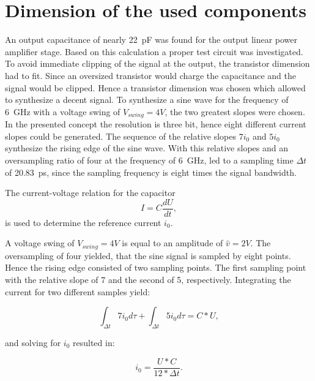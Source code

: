 \section{Dimension of the used components}
An output capacitance of nearly \SI{22}{\pico \farad} was found for the output linear power amplifier stage.
Based on this calculation a proper test circuit was investigated.
To avoid immediate clipping of the signal at the output, the transistor dimension had to fit.
Since an oversized transistor would charge the capacitance and the signal would be clipped.
Hence a transistor dimension was chosen which allowed to synthesize a decent signal.
To synthesize a sine wave for the frequency of \SI{6}{\giga \hertz} with a voltage swing of $V_{swing} = 4V$, the two greatest slopes were chosen.
In the presented concept the resolution is three bit, hence eight different current slopes could be generated.
The sequence of the relative slopes $7 i_0$ and $5 i_0$ synthesize the rising edge of the sine wave.
With this relative slopes and an oversampling ratio of four at the frequency of \SI{6}{\giga \hertz}, led to a sampling time $\Delta t$ of \SI{20.83}{\pico \second}, since the sampling frequency is eight times the signal bandwidth.

The current-voltage relation for the capacitor
\begin{equation}
	I = C \frac{d U}{d t},
\end{equation}
is used to determine the reference current $i_0$.

A voltage swing of $V_{swing} = 4V$ is equal to an amplitude of $\hat{v} = 2V$.
The oversampling of four yielded, that the sine signal is sampled by eight points.
Hence the rising edge consisted of two sampling points.
The first sampling point with the relative slope of 7 and the second of 5, respectively.
Integrating the current for two different samples yield:

\begin{equation}
\int_{\Delta t} 7 i_0 d\tau + \int_{\Delta t} 5 i_0 d \tau = C*U,
\end{equation}

and solving for $i_0$ resulted in:

\begin{equation}
i_0 = \frac{U*C}{12*\Delta t}.
\end{equation}

